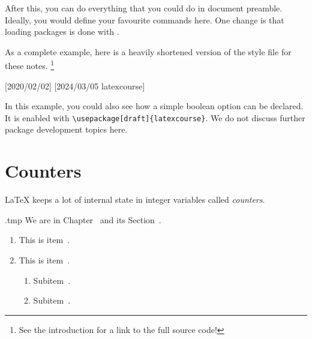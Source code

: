 After this, you can do everything that you could do in document preamble.
Ideally, you would define your favourite commands here.
One change is that loading packages is done with .

As a complete example, here is a heavily shortened version of the style file for these notes.%
\footnote{See the introduction for a link to the full source code!}
%
\begin{ExampleCode}
[2020/02/02]
[2024/03/05 latexcourse]

\ProcessOptions\relax

\RequirePackage{mathtools}
\RequirePackage{csquotes}
\RequirePackage[hidelinks]{hyperref}

\RequirePackage{amsthm}
\RequirePackage{thmtools}
\end{ExampleCode}

In this example, you could also see how a simple boolean option can be declared.
It is enabled with \verb|\usepackage[draft]{latexcourse}|.
We do not discuss further package development topics here.



%
%
%
\section{Counters}\label{sec:counters}

\LaTeX{} keeps a lot of internal state in integer variables called \emph{counters}.

\begin{VerbatimOut}{\jobname.tmp}
We are in Chapter~
and its Section~.

\begin{enumerate}
\item This is item~.
\item This is item~.
  \begin{enumerate}
  \item Subitem~.
  \item Subitem~.
  \end{enumerate}
\end{enumerate}
\end{VerbatimOut}
\ShowExample

